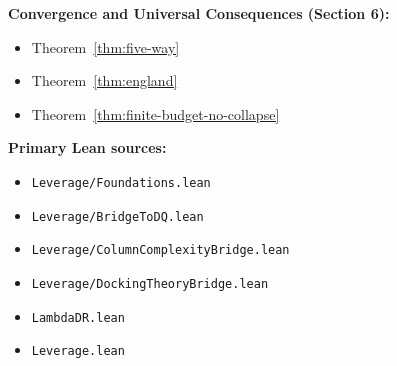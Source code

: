 \textbf{Convergence and Universal Consequences (Section 6):}
\begin{itemize}
\item Theorem~\ref{thm:five-way}
\item Theorem~\ref{thm:england}
\item Theorem~\ref{thm:finite-budget-no-collapse}
\end{itemize}

\textbf{Primary Lean sources:}
\begin{itemize}
\item \texttt{Leverage/Foundations.lean}
\item \texttt{Leverage/BridgeToDQ.lean}
\item \texttt{Leverage/ColumnComplexityBridge.lean}
\item \texttt{Leverage/DockingTheoryBridge.lean}
\item \texttt{LambdaDR.lean}
\item \texttt{Leverage.lean}
\end{itemize}
